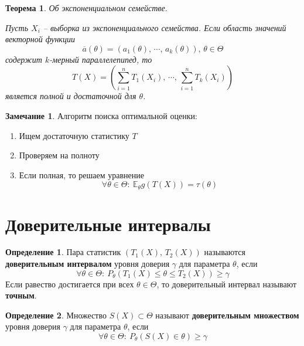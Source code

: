 \documentclass[a4paper,12pt]{article}
\renewcommand{\leq}{\ensuremath{\leqslant}}
\renewcommand{\geq}{\ensuremath{\geqslant}}
\theoremstyle{plain}
\newtheorem{theorem}{Теорема}[section]
\theoremstyle{definition}
\newtheorem{definition}{Определение}[section]
\newtheorem*{note}{Замечание}
\theoremstyle{remark}
\begin{document}
\begin{theorem}
  Об экспоненциальном семействе.

  Пусть $X_i$ -- выборка из экспоненциального семейства. Если область значений векторной функции 
  \[
    \overline{a}(\theta) = (a_1(\theta),\,\cdots,\,a_k(\theta)),\, \theta \in \Theta
  \]
  содержит $k$-мерный параллелепипед, то
  \[
    T(X) = (\sum_{i = 1}^nT_1(X_i),\,\cdots,\,\sum_{i = 1}^nT_k(X_i))
  \]
  является полной и достаточной для $\theta$.
\end{theorem}

\begin{note}
  Алгоритм поиска оптимальной оценки:
  \begin{enumerate}
    \item Ищем достаточную статистику $T$
    \item Проверяем на полноту
    \item Если полная, то решаем уравнение 
    \[
      \forall \theta \in \Theta :\: \mathbb{E}_\theta g(T(X)) = \tau(\theta)
    \]
  \end{enumerate}
\end{note}

\section{Доверительные интервалы}
\begin{definition}
    Пара статистик $(T_1(X),\,T_2(X))$ называются \textbf{доверительным интервалом} уровня доверия $\gamma$ для параметра $\theta$, если 
    \[
      \forall \theta \in \Theta :\: P_\theta(T_1(X) \leq \theta \leq T_2(X)) \geq \gamma
    \]
    Если равество достигается при всех $\theta \in \Theta$, то доверительный интервал называют \textbf{точным}.
\end{definition}

\begin{definition}
  Множество $S(X) \subset \Theta$ называют \textbf{доверительным множеством} уровня доверия $\gamma$ для параметра $\theta$, если
  \[
    \forall \theta \in \Theta :\: P_\theta(S(X) \in \theta) \geq \gamma
  \]
\end{definition}
\end{document}
